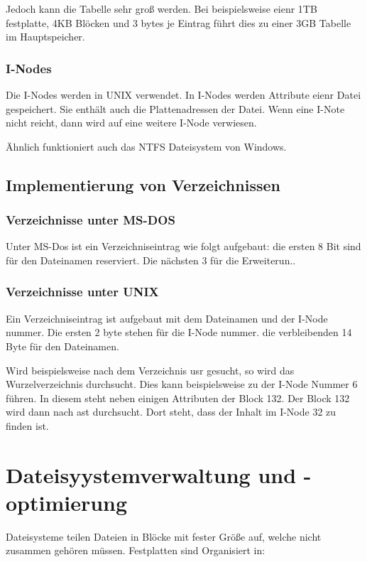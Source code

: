 Jedoch kann die Tabelle sehr groß werden. Bei beispielsweise eienr 1TB
festplatte, 4KB Blöcken und 3 bytes je Eintrag führt dies zu einer 3GB Tabelle
im Hauptspeicher.

\subsubsection{I-Nodes}

Die I-Nodes werden in UNIX verwendet. In I-Nodes werden Attribute eienr Datei
gespeichert. Sie enthält auch die Plattenadressen der Datei. Wenn eine I-Note
nicht reicht, dann wird auf eine weitere I-Node verwiesen.

Ähnlich funktioniert auch das NTFS Dateisystem von Windows.

\subsection{Implementierung von Verzeichnissen}

\subsubsection{Verzeichnisse unter MS-DOS}

Unter MS-Dos ist ein Verzeichniseintrag wie folgt aufgebaut: die ersten 8 Bit
sind für den Dateinamen reserviert. Die nächsten 3 für die Erweiterun..

\subsubsection{Verzeichnisse unter UNIX}

Ein Verzeichniseintrag ist aufgebaut mit dem Dateinamen und der I-Node nummer.
Die ersten 2 byte stehen für die I-Node nummer. die verbleibenden 14 Byte für
den Dateinamen.

Wird beispielsweise nach dem Verzeichnis usr gesucht, so wird das
Wurzelverzeichnis durchsucht. Dies kann beispielsweise zu der I-Node Nummer 6
führen. In diesem steht neben einigen Attributen der Block 132. Der Block 132
wird dann nach ast durchsucht. Dort steht, dass der Inhalt im I-Node 32 zu
finden ist.

\section{Dateisyystemverwaltung und -optimierung}

Dateisysteme teilen Dateien in Blöcke mit fester Größe auf, welche nicht
zusammen gehören müssen. Festplatten sind Organisiert in:

